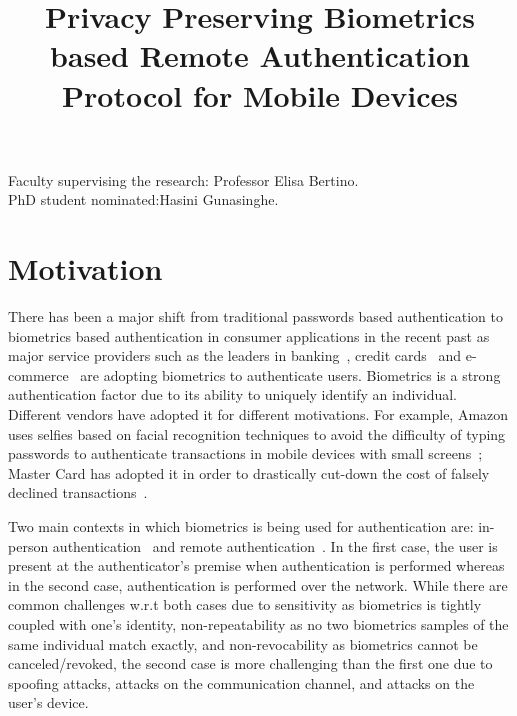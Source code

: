 \documentclass[10pt]{article}
\title{
\vspace{-20.mm}
Privacy Preserving Biometrics based Remote Authentication Protocol for Mobile Devices}
\date{\vspace{-5ex}}
\begin{document}
\maketitle
Faculty supervising the research: Professor Elisa Bertino.\\
PhD student nominated:\quad \quad \quad \quad Hasini Gunasinghe.
\section{Motivation}
There has been a major shift from traditional passwords based authentication to biometrics based authentication in consumer applications in the 
recent past as major service providers such as the leaders in banking~\cite{citi, hsbc, usaa}, credit cards~\cite{mastercard} and 
e-commerce~\cite{amazon, alibaba} are adopting biometrics to authenticate users.
Biometrics is a strong authentication factor due to its ability to uniquely identify an individual. Different 
vendors have adopted it for different motivations. For example, Amazon uses selfies based on facial recognition techniques to avoid the difficulty of typing passwords to authenticate transactions in mobile devices with small screens~\cite{amazon}; Master Card has adopted it in order to 
drastically cut-down the cost of falsely declined transactions~\cite{mastercard}.

Two main contexts in which biometrics is being used for authentication are: in-person authentication~\cite{google} and remote 
authentication~\cite{hsbc}. In the first case, the user is present at the authenticator's premise when authentication is performed 
whereas in the second case, authentication is performed over the network. 
While there are common challenges w.r.t both cases due to sensitivity as biometrics is tightly coupled with one's identity, non-repeatability as no 
two biometrics samples of the same individual match exactly, and non-revocability as biometrics cannot be canceled/revoked, the second case is more 
challenging than the first one due to spoofing attacks, attacks on the communication channel, and attacks on the user's device. 
\end{document}
